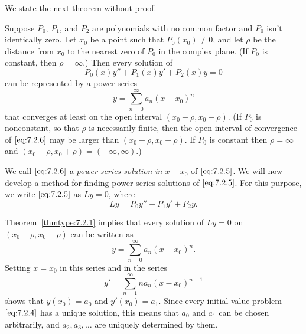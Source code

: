 \documentclass{ximera}
\begin{document}
We state the next theorem without proof.

\begin{theorem}\label{thmtype:7.2.1}
Suppose $P_0$, $P_1$, and $P_2$ are polynomials with no common
factor and $P_0$ isn't identically zero. Let $x_0$ be a point such
that $P_0(x_0)\neq0$, and let $\rho$ be the distance from $x_0$ to the
nearest zero of $P_0$ in the complex plane. (If $P_0$ is constant,
then $\rho=\infty$.) Then every solution of
\begin{equation}\label{eq:7.2.5}
P_0(x)y''+P_1(x)y'+P_2(x)y=0
\end{equation}
can be represented by a power series
 \begin{equation}\label{eq:7.2.6}
y=\sum_{n=0}^\infty a_n(x-x_0)^n
\end{equation}
that converges at least on the open interval $(x_0-\rho,x_0+\rho)$.
(If $P_0$ is nonconstant, so that $\rho$ is necessarily finite,
then the open interval of convergence of $\eqref{eq:7.2.6}$ may be larger
than $(x_0-\rho,x_0+\rho)$. If $P_0$ is constant then $\rho=\infty$
and $(x_0-\rho,x_0+\rho)=(-\infty,\infty)$.)
\end{theorem}

We call $\eqref{eq:7.2.6}$ a \textit{power series solution in $x-x_0$}  of
$\eqref{eq:7.2.5}$. We will now develop a method for finding power series solutions of $\eqref{eq:7.2.5}$. For this purpose, we write $\eqref{eq:7.2.5}$ as
$Ly=0$, where
\begin{equation}\label{eq:7.2.7}
Ly=P_0y''+P_1y'+P_2y.
\end{equation}

Theorem~\ref{thmtype:7.2.1} implies that every solution of $Ly=0$ on
$(x_0-\rho,x_0+\rho)$ can be written as
$$
y=\sum_{n=0}^\infty a_n(x-x_0)^n.
$$
Setting $x=x_0$ in this series and in the series
$$
y'=\sum_{n=1}^\infty na_n(x-x_0)^{n-1}
$$
shows that $y(x_0)=a_0$ and $y'(x_0)=a_1$. Since every initial value
problem $\eqref{eq:7.2.4}$ has a unique solution, this means that $a_0$ and
$a_1$ can be chosen arbitrarily, and $a_2, a_3, \dots$ are
uniquely determined by them.
\end{document}
